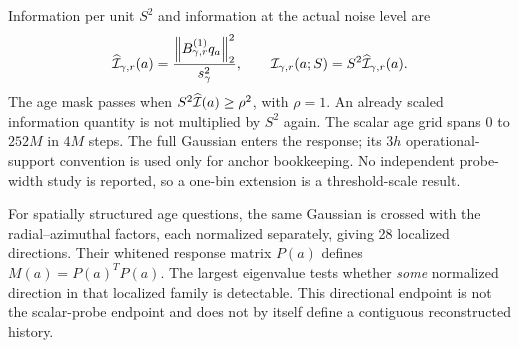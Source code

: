 Information per unit $S^2$ and information at the actual noise level are
\begin{equation}
\widehat{\mathcal I}_{\gamma,r}(a)=\frac{\left\lVert B_{\gamma,r}^{(1)}q_a\right\rVert_2^2}{s_\gamma^2},
\qquad \mathcal I_{\gamma,r}(a;S)=S^2\widehat{\mathcal I}_{\gamma,r}(a).
\label{eq:probeinformation}
\end{equation}
The age mask passes when $S^2\widehat{\mathcal I}(a)\geq\rho^2$, with $\rho=1$. An already scaled information quantity is not multiplied by $S^2$ again. The scalar age grid spans $0$ to $252M$ in $4M$ steps. The full Gaussian enters the response; its $3h$ operational-support convention is used only for anchor bookkeeping. No independent probe-width study is reported, so a one-bin extension is a threshold-scale result.

For spatially structured age questions, the same Gaussian is crossed with the radial--azimuthal factors, each normalized separately, giving 28 localized directions. Their whitened response matrix $P(a)$ defines $M(a)=P(a)^TP(a)$. The largest eigenvalue tests whether \emph{some} normalized direction in that localized family is detectable. This directional endpoint is not the scalar-probe endpoint and does not by itself define a contiguous reconstructed history.
